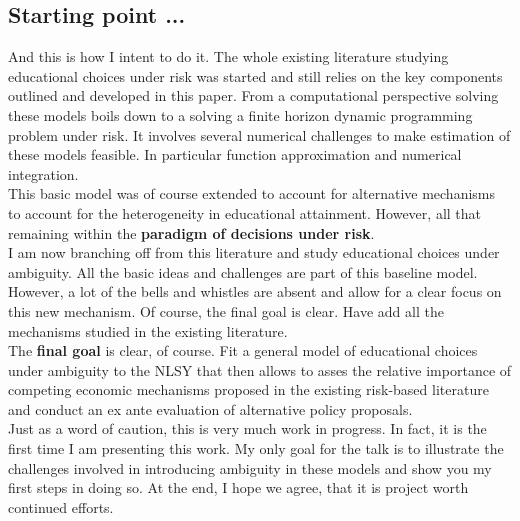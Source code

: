 \subsection{Starting point ...}
And this is how I intent to do it. The whole existing literature studying educational choices under risk was started and still relies on the key components outlined and developed in this paper. From a computational perspective solving these models boils down to a solving a finite horizon dynamic programming problem under risk. It involves several numerical challenges to make estimation of these models feasible. In particular function approximation and numerical integration.\\\newline
%
This basic model was of course extended to account for alternative mechanisms to account for the heterogeneity in educational attainment. However, all that remaining within the \textbf{paradigm of decisions under risk}.\\\newline
%
I am now branching off from this literature and study educational choices under ambiguity. All the basic ideas and challenges are part of this baseline model. However, a lot of the bells and whistles are absent and allow for a clear focus on this new mechanism. Of course, the final goal is clear. Have add all the mechanisms studied in the existing literature.\\\newline
%
The \textbf{final goal} is clear, of course. Fit a general model of educational choices under ambiguity to the NLSY that then allows to asses the relative importance of competing economic mechanisms proposed in the existing risk-based literature and conduct an ex ante evaluation of alternative policy proposals.\\\newline
%
Just as a word of caution, this is very much work in progress. In fact, it is the first time I am presenting this work. My only goal for the talk is to illustrate the challenges involved in introducing ambiguity in these models and show you my first steps in doing so. At the end, I hope we agree, that it is project worth continued efforts.